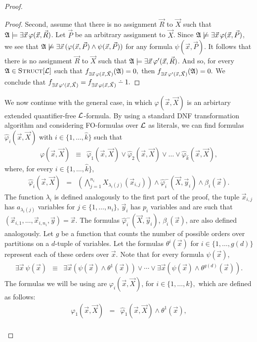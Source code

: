 \documentclass[12pt]{article}
\def\dotminus{\mathbin{\ooalign{\hss\raise1ex\hbox{.}\hss\cr
  \mathsurround=0pt$-$}}}
\def\Truc{\textsc{Struct}[\L]}
\def\A{{\frak A}}
\def\L{{\cal L}}
\def\P{\vec{P}}
\def\R{\vec{R}}
\def\X{\vec{X}}
\def\x{\vec{x}} %
\def\y{\vec{y}} %
\begin{document}
\begin{proof}
\begin{enumerate}
\begin{proof}
Second, assume that there is no assignment $\R$ to $\X$ such that $\A\models\exists\x\,\varphi(\x,\R)$. Let $\P$ be an arbitrary assignment to $\X$. Since $\A\not\models\exists\x\,\varphi(\x,\P)$, we see that $\A\not\models\exists\x\,(\varphi(\x,\P)\wedge\psi(\x,\P))$ for any formula $\psi(\x,\P)$. It follows that there is no assignment $\R$ to $\X$ such that $\A\models\exists\x\,\varphi^\prime(\x,\R)$. And so, for every $\A\in\Truc$ such that $f_{\exists\x\,\varphi(\x,\X)}(\A)=0,$ then $f_{\exists\x\,\varphi^\prime(\x,\X)}(\A) = 0.$ We conclude that $f_{\exists\x\,\varphi^\prime(\x,\X)} = f_{\exists\x\,\varphi(\x,\X)}\dotminus 1.$
\end{proof}

We now continue with the general case, in which $\varphi(\x,\X)$ is an arbirtary extended quantifier-free $\L$-formula. By using a standard DNF transformation algorithm and considering FO-formulas over $\L$ as literals, we can find formulas $\hat{\varphi}_i(\x,\X)$ with $i\in\{1,\ldots,\hat{k}\}$ such that
\begin{eqnarray*}
\varphi(\x,\X) &\equiv& \hat{\varphi}_1(\x,\X) \vee \hat{\varphi}_2(\x,\X) \vee \dots  \vee \hat{\varphi}_{\hat{k}}(\x,\X),
\end{eqnarray*}
where, for every $i\in\{1,\ldots,\hat{k}\}$, 
\begin{eqnarray*}
\hat{\varphi}_i(\x,\X) &=& \left( \bigwedge_{j=1}^{n_i} X_{\lambda_i(j)}(\x_{i,j}) \right) \wedge \hat{\varphi}^{-}_i(\X,\y_i)  \wedge \beta_i(\x).
\end{eqnarray*}
The function $\lambda_i$ is defined analogously to the first part of the proof, the tuple $\x_{i,j}$ has $a_{\lambda_i(j)}$ variables for $j\in\{1,\ldots,n_i\}$, $\y_i$ has $p_i$ variables and are such that $(\x_{i,1},\ldots,\x_{i,n_i},\y) = \x.$ The formulas $\hat{\varphi}^{-}_i(\X,\y_i)$, $\beta_i(\x)$, are also defined analogously. Let $g$ be a function that counts the number of possible orders over partitions on a $d$-tuple of variables. Let the formulas $\theta^i(\x)$ for $i\in\{1,\ldots,g(d)\}$ represent each of these orders over $\x$. Note that for every formula $\psi(\x)$,
\begin{eqnarray*}
\exists\x\:\psi(\x) &\equiv& \exists\x(\psi(\x)\wedge\theta^1(\x)) \vee \cdots \vee \exists\x(\psi(\x)\wedge\theta^{g(d)}(\x)).
\end{eqnarray*}
The formulas we will be using are $\varphi_i(\x,\X)$, for $i\in\{1,\ldots,k\},$ which are defined as follows: 
\begin{eqnarray*}
\varphi_1(\x,\X) &=& \hat{\varphi}_1(\x,\X) \wedge \theta^1(\x), \\

\end{eqnarray*}
\end{enumerate}
\end{proof}
\end{document}
